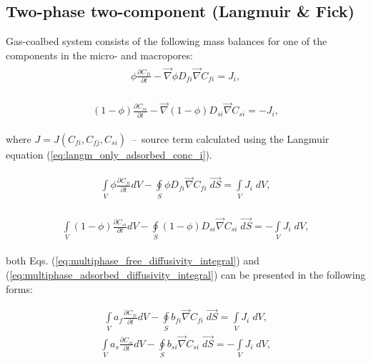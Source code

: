 \subsection*{Two-phase two-component (Langmuir \& Fick)}
Gas-coalbed system consists of the following mass balances for one of the components in the micro- and macropores:
\begin{eqnarray}
\begin{gathered}
\label{eq:multiphase_free_diffusivity_differential}
\phi \frac{\partial C_{fi}}{\partial t}  - \vec{\nabla} \phi D_{fi} \vec{\nabla}C_{fi} = J_i,
\end{gathered}
\end{eqnarray}

\begin{eqnarray}
\begin{gathered}
\label{eq:multiphase_adsorbed_diffusivity_differential}
\left(\mathit{1}-\phi\right) \frac{\partial C_{si}}{\partial t}  - \vec{\nabla} \left(\mathit{1}-\phi\right) D_{si} \vec{\nabla}C_{si} = -J_i,
\end{gathered}
\end{eqnarray}

where $J=J\left(C_{fi}, C_{fj}, C_{si} \right)$~--~source term calculated using the Langmuir equation (\ref{eq:langm_only_adsorbed_conc_i}).

\begin{eqnarray}
\begin{gathered}
\label{eq:multiphase_free_diffusivity_integral}
\int \limits_{V} \phi \frac{\partial C_{fi}}{\partial t} dV  - \oint \limits_{S} \phi D_{fi} \vec{\nabla}C_{fi} \; \vec{dS} = \int \limits_{V} J_i \; dV,
\end{gathered}
\end{eqnarray}

\begin{eqnarray}
\begin{gathered}
\label{eq:multiphase_adsorbed_diffusivity_integral}
\int \limits_{V} \left(\mathit{1}-\phi\right) \frac{\partial C_{si}}{\partial t} dV - \oint \limits_{S} \left(\mathit{1}-\phi\right) D_{si} \vec{\nabla}C_{si} \; \vec{dS} = -\int \limits_{V}J_i \; dV,
\end{gathered}
\end{eqnarray}

both Eqs. (\ref{eq:multiphase_free_diffusivity_integral}) and (\ref{eq:multiphase_adsorbed_diffusivity_integral}) can be presented in the following forms:

\begin{eqnarray}
\label{eq:multiphase_diffusivity_simplified_integral_1}
\int \limits_{V} a_{f} \frac{\partial C_{fi}}{\partial t} dV - \oint \limits_{S} b_{fi} \vec{\nabla}C_{fi} \; \vec{dS} = \int \limits_{V} J_{i} \; dV,
\end{eqnarray}
\begin{eqnarray}
\label{eq:multiphase_diffusivity_simplified_integral_2}
\int \limits_{V} a_{s} \frac{\partial C_{si}}{\partial t} dV - \oint \limits_{S} b_{si} \vec{\nabla}C_{si} \; \vec{dS} = -\int \limits_{V} J_{i} \; dV,
\end{eqnarray}

